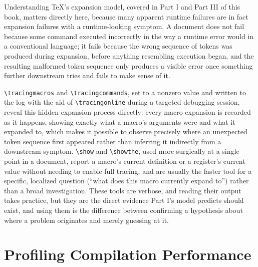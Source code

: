 Understanding TeX's expansion model, covered in Part I and Part III of this book, matters directly here, because many apparent runtime failures are in fact expansion failures with a runtime-looking symptom. A document does not fail because some command executed incorrectly in the way a runtime error would in a conventional language; it fails because the wrong sequence of tokens was produced during expansion, before anything resembling execution began, and the resulting malformed token sequence only produces a visible error once something further downstream tries and fails to make sense of it.

\texttt{\textbackslash{}tracingmacros} and \texttt{\textbackslash{}tracingcommands}, set to a nonzero value and written to the log with the aid of \texttt{\textbackslash{}tracingonline} during a targeted debugging session, reveal this hidden expansion process directly: every macro expansion is recorded as it happens, showing exactly what a macro's arguments were and what it expanded to, which makes it possible to observe precisely where an unexpected token sequence first appeared rather than inferring it indirectly from a downstream symptom. \texttt{\textbackslash{}show} and \texttt{\textbackslash{}showthe}, used more surgically at a single point in a document, report a macro's current definition or a register's current value without needing to enable full tracing, and are usually the faster tool for a specific, localized question (``what does this macro currently expand to'') rather than a broad investigation. These tools are verbose, and reading their output takes practice, but they are the direct evidence Part I's model predicts should exist, and using them is the difference between confirming a hypothesis about where a problem originates and merely guessing at it.

\hypertarget{profiling-compilation-performance}{%
\section{Profiling Compilation Performance}\label{profiling-compilation-performance}}


